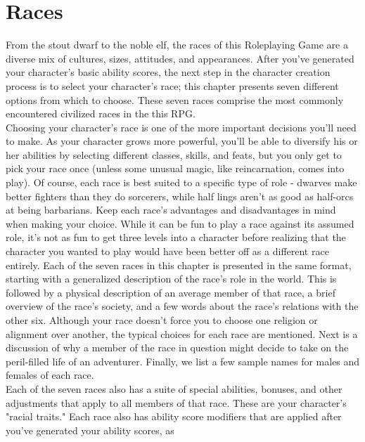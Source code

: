 
\chapter{Races}
From the stout dwarf to the noble elf, the races of this 
 Roleplaying Game are a diverse mix of cultures,
 sizes, attitudes, and appearances. After you've generated your character's basic ability scores,
the next step in the character creation process is to
select your character's race; this chapter presents seven
different options from which to choose. These seven
races comprise the most commonly encountered civilized
races in the this RPG.\\
Choosing your character's race is one of the more
important decisions you'll need to make. As your
character grows more powerful, you'll be able to diversify
his or her abilities by selecting different classes, skills,
and feats, but you only get to pick your race once (unless
some unusual magic, like reincarnation, comes into
play). Of course, each race is best suited to a specific
type of role - dwarves make better fighters than they
do sorcerers, while half lings aren't as good as half-orcs
at being barbarians. Keep each race's advantages and
disadvantages in mind when making your choice. While
it can be fun to play a race against its assumed role, it's not
as fun to get three levels into a character before realizing
that the character you wanted to play would have been
better off as a different race entirely.
Each of the seven races in this chapter is presented in
the same format, starting with a generalized description
of the race's role in the world. This is followed by a physical
description of an average member of that race, a brief
overview of the race's society, and a few words about the
race's relations with the other six. Although your race
doesn't force you to choose one religion or alignment over
another, the typical choices for each race are mentioned.
Next is a discussion of why a member of the race in
question might decide to take on the peril-filled life of an
 adventurer. Finally, we list a few sample names for males
and females of each race.\\
Each of the seven races also has a suite of special abilities,
bonuses, and other adjustments that apply to all members
of that race. These are your character's "racial traits."
Each race also has ability score modifiers that are
applied after you've generated your ability scores, as
